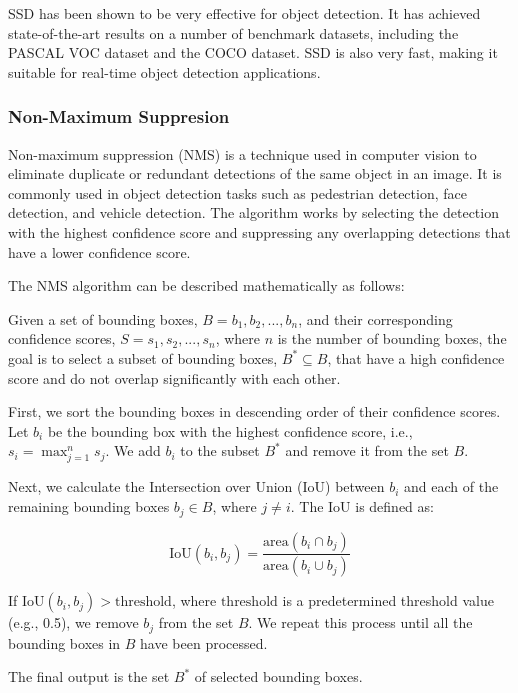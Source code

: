 \documentclass[final,dissertation.tex]{subfiles}
\begin{document}
SSD has been shown to be very effective for object detection. It has achieved state-of-the-art results on a number of benchmark datasets, including the PASCAL VOC dataset and the COCO dataset. SSD is also very fast, making it suitable for real-time object detection applications.

\subsubsection{Non-Maximum Suppresion}

Non-maximum suppression (NMS) is a technique used in computer vision to eliminate duplicate or redundant detections of the same object in an image. It is commonly used in object detection tasks such as pedestrian detection, face detection, and vehicle detection. The algorithm works by selecting the detection with the highest confidence score and suppressing any overlapping detections that have a lower confidence score.

The NMS algorithm can be described mathematically as follows:

Given a set of bounding boxes, $B = {b_1, b_2, ..., b_n}$, and their corresponding confidence scores, $S = {s_1, s_2, ..., s_n}$, where $n$ is the number of bounding boxes, the goal is to select a subset of bounding boxes, $B^* \subseteq B$, that have a high confidence score and do not overlap significantly with each other.

First, we sort the bounding boxes in descending order of their confidence scores. Let $b_i$ be the bounding box with the highest confidence score, i.e., $s_i = \max_{j=1}^{n} s_j$. We add $b_i$ to the subset $B^*$ and remove it from the set $B$.

Next, we calculate the Intersection over Union (IoU) between $b_i$ and each of the remaining bounding boxes $b_j \in B$, where $j \neq i$. The IoU is defined as:

\begin{equation*}
    \text{IoU}(b_i, b_j) = \frac{\text{area}(b_i \cap b_j)}{\text{area}(b_i \cup b_j)}
\end{equation*}

If $\text{IoU}(b_i, b_j) > \text{threshold}$, where $\text{threshold}$ is a predetermined threshold value (e.g., 0.5), we remove $b_j$ from the set $B$. We repeat this process until all the bounding boxes in $B$ have been processed.

The final output is the set $B^*$ of selected bounding boxes.
\end{document}
